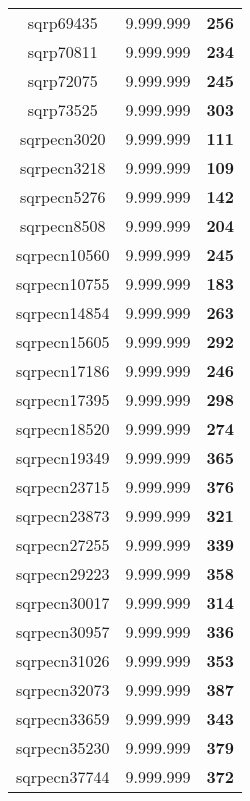 \begin{tabular}{cc||c}
sqrp69435        & 9.999.999        & {\bf 256}       \\ 
sqrp70811        & 9.999.999        & {\bf 234}       \\ 
sqrp72075        & 9.999.999        & {\bf 245}       \\ 
sqrp73525        & 9.999.999        & {\bf 303}       \\ 
sqrpecn3020      & 9.999.999        & {\bf 111}       \\ 
sqrpecn3218      & 9.999.999        & {\bf 109}       \\ 
sqrpecn5276      & 9.999.999        & {\bf 142}       \\ 
sqrpecn8508      & 9.999.999        & {\bf 204}       \\ 
sqrpecn10560     & 9.999.999        & {\bf 245}       \\ 
sqrpecn10755     & 9.999.999        & {\bf 183}       \\ 
sqrpecn14854     & 9.999.999        & {\bf 263}       \\ 
sqrpecn15605     & 9.999.999        & {\bf 292}       \\ 
sqrpecn17186     & 9.999.999        & {\bf 246}       \\ 
sqrpecn17395     & 9.999.999        & {\bf 298}       \\ 
sqrpecn18520     & 9.999.999        & {\bf 274}       \\ 
sqrpecn19349     & 9.999.999        & {\bf 365}       \\ 
sqrpecn23715     & 9.999.999        & {\bf 376}       \\ 
sqrpecn23873     & 9.999.999        & {\bf 321}       \\ 
sqrpecn27255     & 9.999.999        & {\bf 339}       \\ 
sqrpecn29223     & 9.999.999        & {\bf 358}       \\ 
sqrpecn30017     & 9.999.999        & {\bf 314}       \\ 
sqrpecn30957     & 9.999.999        & {\bf 336}       \\ 
sqrpecn31026     & 9.999.999        & {\bf 353}       \\ 
sqrpecn32073     & 9.999.999        & {\bf 387}       \\ 
sqrpecn33659     & 9.999.999        & {\bf 343}       \\ 
sqrpecn35230     & 9.999.999        & {\bf 379}       \\ 
sqrpecn37744     & 9.999.999        & {\bf 372}       \\ 

\end{tabular}

